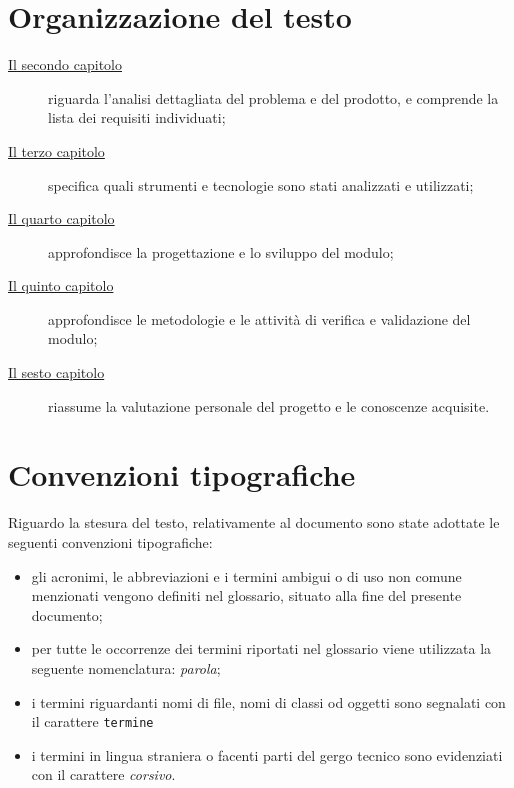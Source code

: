 \section{Organizzazione del testo}

\begin{description}
    \item[{\hyperref[cap:analisi-del-problema]{Il secondo capitolo}}] riguarda l'analisi dettagliata del problema e del prodotto, e comprende la lista dei requisiti individuati;
    
    \item[{\hyperref[cap:strumenti-e-tecnologie]{Il terzo capitolo}}] specifica quali strumenti e tecnologie sono stati analizzati e utilizzati;
    
    \item[{\hyperref[cap:progettazione-codifica]{Il quarto capitolo}}] approfondisce la progettazione e lo sviluppo del modulo;
    
    \item[{\hyperref[cap:verifica-validazione]{Il quinto capitolo}}] approfondisce le metodologie e le attività di verifica e validazione del modulo;
    
    \item[{\hyperref[cap:conclusioni]{Il sesto capitolo}}] riassume la valutazione personale del progetto e le conoscenze acquisite.
\end{description}

\section{Convenzioni tipografiche}

Riguardo la stesura del testo, relativamente al documento sono state adottate le seguenti convenzioni tipografiche:
\begin{itemize}
	\item gli acronimi, le abbreviazioni e i termini ambigui o di uso non comune menzionati vengono definiti nel glossario, situato alla fine del presente documento;
	\item per tutte le occorrenze dei termini riportati nel glossario viene utilizzata la seguente nomenclatura: \emph{parola}\glsfirstoccur;
	\item i termini riguardanti nomi di file, nomi di classi od oggetti sono segnalati con il carattere \texttt{termine}
	\item i termini in lingua straniera o facenti parti del gergo tecnico sono evidenziati con il carattere \emph{corsivo}.
\end{itemize}